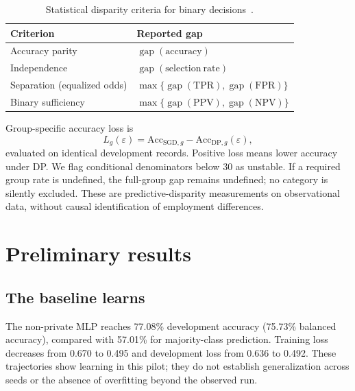 \documentclass[11pt,letterpaper]{article}
\newcommand{\eps}{\varepsilon}
\begin{document}
\begin{table}[H]
\centering\small
\begin{tabular}{ll}\toprule
Criterion & Reported gap\\\midrule
Accuracy parity & $\operatorname{gap}(\mathrm{accuracy})$\\
Independence & $\operatorname{gap}(\mathrm{selection\ rate})$\\
Separation (equalized odds) & $\max\{\operatorname{gap}(\mathrm{TPR}),\operatorname{gap}(\mathrm{FPR})\}$\\
Binary sufficiency & $\max\{\operatorname{gap}(\mathrm{PPV}),\operatorname{gap}(\mathrm{NPV})\}$\\\bottomrule
\end{tabular}
\caption{Statistical disparity criteria for binary decisions~\cite{fairmlbook,hardt2016}.}\label{tab:metrics}
\end{table}
Group-specific accuracy loss is
\[
L_g(\eps)=\mathrm{Acc}_{\mathrm{SGD},g}-\mathrm{Acc}_{\mathrm{DP},g}(\eps),
\]
evaluated on identical development records. Positive loss means lower accuracy under DP. We flag conditional denominators below 30 as unstable. If a required group rate is undefined, the full-group gap remains undefined; no category is silently excluded. These are predictive-disparity measurements on observational data, without causal identification of employment differences.

\section{Preliminary results}
\subsection{The baseline learns}
The non-private MLP reaches 77.08\% development accuracy (75.73\% balanced accuracy), compared with 57.01\% for majority-class prediction. Training loss decreases from 0.670 to 0.495 and development loss from 0.636 to 0.492. These trajectories show learning in this pilot; they do not establish generalization across seeds or the absence of overfitting beyond the observed run.
\end{document}
